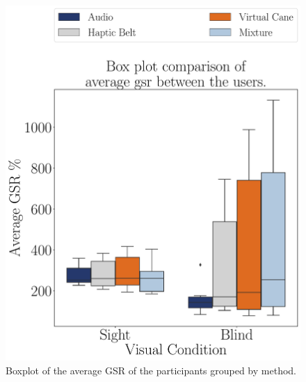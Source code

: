 \begin{figure}[!htb]
    \centering
    \begin{minipage}{0.45\textwidth}
        \centering
        \includegraphics[width = \textwidth]{Resultados/GSR/Figuras/pdf/boxplot_gsr_avg_4_scene.pdf}
        \caption{Boxplot of the average GSR of the participants grouped by method.}
        \label{fig:boxplot_gsr_avg_4_scene}
    \end{minipage}
    \begin{minipage}{0.075\textwidth}
        \hfill
    \end{minipage}
    \begin{minipage}{0.45\textwidth}
        \centering

\end{minipage}
\end{figure}
